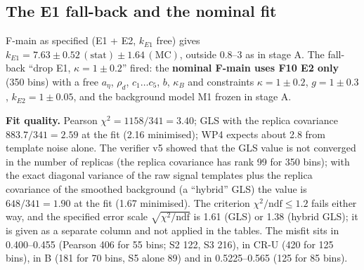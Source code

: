 \documentclass[11pt,a4paper]{article}
\newcommand{\nbinv}{\ensuremath{\mathrm{nb}^{-1}}\xspace}
\newcommand{\code}[1]{\texttt{\detokenize{#1}}}
\newcommand{\aEta}{\ensuremath{a_\eta}\xspace}
\newcommand{\kB}{\ensuremath{\kappa_B}\xspace}
\newcommand{\rhod}{\ensuremath{\rho_d}\xspace}
\newcommand{\kEone}{\ensuremath{k_{E1}}\xspace}
\newcommand{\kEtwo}{\ensuremath{k_{E2}}\xspace}
\newcommand{\tabin}[1]{}
\begin{document}
\subsection{The E1 fall-back and the nominal fit}
\label{sec:fmain}
F-main as specified (E1 + E2, \kEone free) gives $\kEone=7.63\pm0.52\,(\mathrm{stat})\pm1.64\,(\mathrm{MC})$, outside 0.8--3 as in stage A.
The fall-back ``drop E1, $\kappa=1\pm0.2$'' fired: the \textbf{nominal F-main uses F10 E2 only} (350 bins) with a free \aEta, \rhod,
$c_1\dots c_5$, $b$, \kB and constraints $\kappa=1\pm0.2$, $g=1\pm0.3$, $\kEtwo=1\pm0.05$, and the background model M1 frozen in stage A.

\begin{table}[H]
\centering
\caption{Spec.\ Table~E1: parameters of F-main (CROSS-CHECK: it failed the closure test), value $\pm$ stat $\pm$ MC; $^{c}$ constrained. Columns:
nominal (E2, $\kappa=1\pm0.2$), as specified (E1+E2, \kEone free), ``pre'' (E2), data isBest $=1$ (E2, with the isBest $\ge0$
templates). S0 unless stated, $L=6079.2\,\nbinv$. Largest correlations of the nominal fit (stat + MC): $c_j$--$c_k$ about 0.97, $c_j$--\kB
about $-0.9$, \aEta--$g$ $-0.53$, \aEta--$\kappa$ $-0.44$, \aEta--$c_j$ $-0.37$ to $-0.41$, \aEta--$b$ 0.05, \rhod--$\kappa$ 0.04. Source:
WP5 (\code{wp5_tableE1.txt}), verified by v5. Fall-backs: E1 dropped ($\kappa=1\pm0.2$); template fits demoted to cross-checks.}
\label{tab:E1}
\footnotesize
\resizebox{\textwidth}{!}{\tabin{wp5_tableE1.tex}}
\end{table}

\textbf{Fit quality.} Pearson $\chi^2=1158/341=3.40$; GLS with the replica covariance $883.7/341=2.59$ at the fit (2.16 minimised); WP4
expects about 2.8 from template noise alone. The verifier v5 showed that the GLS value is not converged in the number of replicas (the
replica covariance has rank 99 for 350 bins); with the exact diagonal variance of the raw signal templates plus the replica covariance of the
smoothed background (a ``hybrid'' GLS) the value is $648/341=1.90$ at the fit (1.67 minimised). The criterion $\chi^2/\mathrm{ndf}\le1.2$
fails either way, and the specified error scale $\sqrt{\chi^2/\mathrm{ndf}}$ is 1.61 (GLS) or 1.38 (hybrid GLS); it is given as a separate
column and not applied in the tables. The misfit sits in 0.400--0.455 (Pearson 406 for 55 bins; S2 122, S3 216), in CR-U (420 for 125
bins), in B (181 for 70 bins, S5 alone 89) and in 0.5225--0.565 (125 for 85 bins).
\end{document}
